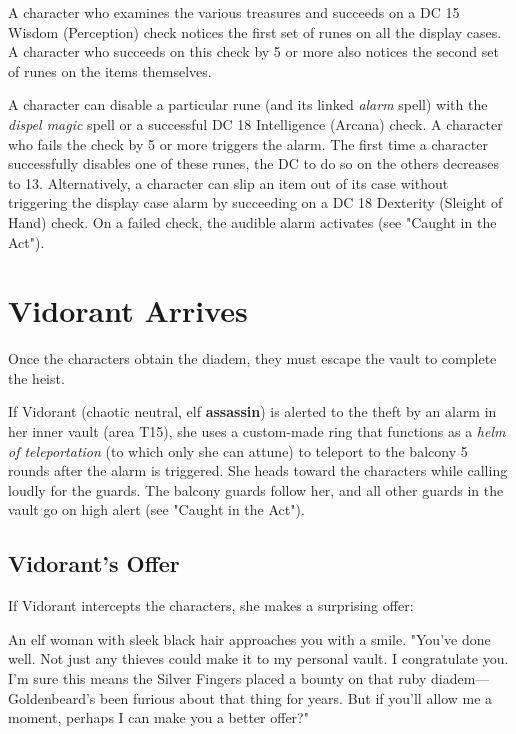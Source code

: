 \documentclass[10pt,a4paper,twoside,bg=print,twocolumn,openany,nodeprecatedcode]{dndbook}
\begin{document}
A character who examines the various treasures and succeeds on a DC 15 Wisdom (Perception) check notices the first set of runes on all the display cases. A character who succeeds on this check by 5 or more also notices the second set of runes on the items themselves.

A character can disable a particular rune (and its linked \textit{alarm} spell) with the \textit{dispel magic} spell or a successful DC 18 Intelligence (Arcana) check. A character who fails the check by 5 or more triggers the alarm. The first time a character successfully disables one of these runes, the DC to do so on the others decreases to 13. Alternatively, a character can slip an item out of its case without triggering the display case alarm by succeeding on a DC 18 Dexterity (Sleight of Hand) check. On a failed check, the audible alarm activates (see "Caught in the Act").

\section{Vidorant Arrives}
Once the characters obtain the diadem, they must escape the vault to complete the heist.

If Vidorant (chaotic neutral, elf \textbf{assassin}) is alerted to the theft by an alarm in her inner vault (area T15), she uses a custom-made ring that functions as a \textit{helm of teleportation} (to which only she can attune) to teleport to the balcony 5 rounds after the alarm is triggered. She heads toward the characters while calling loudly for the guards. The balcony guards follow her, and all other guards in the vault go on high alert (see "Caught in the Act").

\subsection{Vidorant's Offer}
If Vidorant intercepts the characters, she makes a surprising offer:

\begin{DndReadAloud}{}
An elf woman with sleek black hair approaches you with a smile. "You've done well. Not just any thieves could make it to my personal vault. I congratulate you. I'm sure this means the Silver Fingers placed a bounty on that ruby diadem—Goldenbeard's been furious about that thing for years. But if you'll allow me a moment, perhaps I can make you a better offer?"

\end{DndReadAloud}
\end{document}
